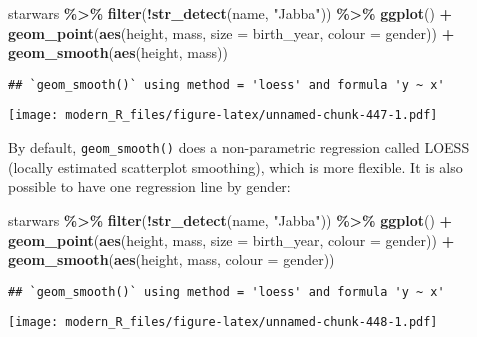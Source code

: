 \documentclass[
]{article}
\newenvironment{Shaded}{\begin{snugshade}}{\end{snugshade}}
\newcommand{\DataTypeTok}[1]{\textcolor[rgb]{0.13,0.29,0.53}{#1}}
\newcommand{\KeywordTok}[1]{\textcolor[rgb]{0.13,0.29,0.53}{\textbf{#1}}}
\newcommand{\NormalTok}[1]{#1}
\newcommand{\OperatorTok}[1]{\textcolor[rgb]{0.81,0.36,0.00}{\textbf{#1}}}
\newcommand{\StringTok}[1]{\textcolor[rgb]{0.31,0.60,0.02}{#1}}
\begin{document}
\begin{Shaded}
\begin{Highlighting}[]
\NormalTok{starwars }\OperatorTok{\%\textgreater{}\%}
\StringTok{  }\KeywordTok{filter}\NormalTok{(}\OperatorTok{!}\KeywordTok{str\_detect}\NormalTok{(name, }\StringTok{"Jabba"}\NormalTok{)) }\OperatorTok{\%\textgreater{}\%}
\StringTok{  }\KeywordTok{ggplot}\NormalTok{() }\OperatorTok{+}
\StringTok{    }\KeywordTok{geom\_point}\NormalTok{(}\KeywordTok{aes}\NormalTok{(height, mass, }\DataTypeTok{size =}\NormalTok{ birth\_year, }\DataTypeTok{colour =}\NormalTok{ gender)) }\OperatorTok{+}
\StringTok{    }\KeywordTok{geom\_smooth}\NormalTok{(}\KeywordTok{aes}\NormalTok{(height, mass))}
\end{Highlighting}
\end{Shaded}

\begin{verbatim}
## `geom_smooth()` using method = 'loess' and formula 'y ~ x'
\end{verbatim}

\texttt{[image: modern\_R\_files/figure-latex/unnamed-chunk-447-1.pdf]}

By default, \texttt{geom\_smooth()} does a non-parametric regression called LOESS (locally estimated scatterplot smoothing),
which is more flexible. It is also possible to have one regression line by gender:

\begin{Shaded}
\begin{Highlighting}[]
\NormalTok{starwars }\OperatorTok{\%\textgreater{}\%}
\StringTok{  }\KeywordTok{filter}\NormalTok{(}\OperatorTok{!}\KeywordTok{str\_detect}\NormalTok{(name, }\StringTok{"Jabba"}\NormalTok{)) }\OperatorTok{\%\textgreater{}\%}
\StringTok{  }\KeywordTok{ggplot}\NormalTok{() }\OperatorTok{+}
\StringTok{    }\KeywordTok{geom\_point}\NormalTok{(}\KeywordTok{aes}\NormalTok{(height, mass, }\DataTypeTok{size =}\NormalTok{ birth\_year, }\DataTypeTok{colour =}\NormalTok{ gender)) }\OperatorTok{+}
\StringTok{    }\KeywordTok{geom\_smooth}\NormalTok{(}\KeywordTok{aes}\NormalTok{(height, mass, }\DataTypeTok{colour =}\NormalTok{ gender))}
\end{Highlighting}
\end{Shaded}

\begin{verbatim}
## `geom_smooth()` using method = 'loess' and formula 'y ~ x'
\end{verbatim}

\texttt{[image: modern\_R\_files/figure-latex/unnamed-chunk-448-1.pdf]}
\end{document}

